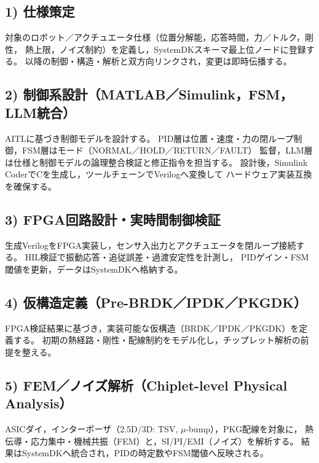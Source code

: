 \subsection{1) 仕様策定}
対象のロボット／アクチュエータ仕様（位置分解能，応答時間，力／トルク，剛性，
熱上限，ノイズ制約）を定義し，SystemDKスキーマ最上位ノードに登録する。
以降の制御・構造・解析と双方向リンクされ，変更は即時伝播する。

\subsection{2) 制御系設計（MATLAB／Simulink，FSM，LLM統合）}
AITLに基づき制御モデルを設計する。
PID層は位置・速度・力の閉ループ制御，FSM層はモード（NORMAL／HOLD／RETURN／FAULT）
監督，LLM層は仕様と制御モデルの論理整合検証と修正指令を担当する。
設計後，Simulink CoderでCを生成し，ツールチェーンでVerilogへ変換して
ハードウェア実装互換を確保する。

\subsection{3) FPGA回路設計・実時間制御検証}
生成VerilogをFPGA実装し，センサ入出力とアクチュエータを閉ループ接続する。
HIL検証で振動応答・追従誤差・過渡安定性を計測し，
PIDゲイン・FSM閾値を更新，データはSystemDKへ格納する。

\subsection{4) 仮構造定義（Pre-BRDK／IPDK／PKGDK）}
FPGA検証結果に基づき，実装可能な仮構造（BRDK／IPDK／PKGDK）を定義する。
初期の熱経路・剛性・配線制約をモデル化し，チップレット解析の前提を整える。

\subsection{5) FEM／ノイズ解析（Chiplet-level Physical Analysis）}
ASICダイ，インターポーザ（2.5D/3D: TSV, $\mu$-bump），PKG配線を対象に，
熱伝導・応力集中・機械共振（FEM）と，SI/PI/EMI（ノイズ）を解析する。
結果はSystemDKへ統合され，PIDの時定数やFSM閾値へ反映される。


